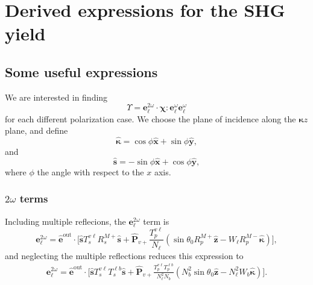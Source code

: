 \chapter{Derived expressions for the SHG yield}


\section{Some useful expressions}
We are interested in finding
\begin{equation*}
\Upsilon = 
\mathbf{e}^{2\omega}_{\ell}\cdot\boldsymbol{\chi}:
\mathbf{e}^{\omega}_{\ell}\mathbf{e}^{\omega}_{\ell}
\end{equation*}
for each different polarization case. We choose the plane of incidence
along the $\boldsymbol{\kappa}z$ plane, and define 
\begin{equation}\label{eq:kappavec}
\hat{\boldsymbol{\kappa}}
= \cos\phi\hat{\mathbf{x}} + \sin\phi\hat{\mathbf{y}},
\end{equation}
and
\begin{equation}\label{eq:svec}
\hat{\mathbf{s}} = -\sin\phi\hat{\mathbf{x}} + \cos\phi\hat{\mathbf{y}},
\end{equation}
where $\phi$ the angle with respect to the $x$ axis.


\subsection{\texorpdfstring{$2\omega$}{2w} terms}

Including multiple reflecions, the $\mathbf{e}^{2\omega}_{\ell}$ term is
\begin{equation}\label{eq:e2wellmr}
\mathbf{e}^{2\omega}_{\ell} = \hat{\mathbf{e}}^{\mathrm{out}}\cdot
\Bigg[
\hat{\mathbf{s}}T_{s}^{v\ell}R^{M+}_{s}\hat{\mathbf{s}} + 
\hat{\mathbf{P}}_{v+}\frac{T^{v\ell}_{p}}{N_{\ell}}
\left(
\sin\theta_{0}R^{M+}_{p}\hat{\mathbf{z}} 
- W_{\ell}R^{M-}_{p}\hat{\boldsymbol{\kappa}}
\right)
\Bigg],
\end{equation}
and neglecting the multiple reflections reduces this expression to
\begin{equation}\label{eq:e2well}
\begin{split}
\mathbf{e}^{2\omega}_{\ell} = 
\hat{\mathbf{e}}^{\mathrm{out}}\cdot
\Bigg[
\hat{\mathbf{s}}T_{s}^{v\ell}T_{s}^{\ell b}\hat{\mathbf{s}} + 
\hat{\mathbf{P}}_{v+}
\frac{T^{v\ell}_{p}T^{\ell b}_{p}}
     {N^{2}_{\ell}N_{b}}
\left(
N^{2}_{b}\sin\theta_{0}\hat{\mathbf{z}} - 
N^{2}_{\ell}W_{b}\hat{\boldsymbol{\kappa}}
\right)
\Bigg].
\end{split}
\end{equation}  

